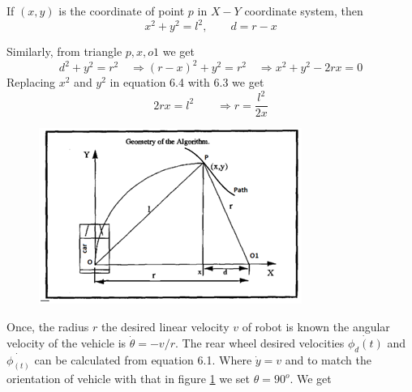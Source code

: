 If $(x,y)$ is the coordinate of point $p$ in $X-Y$ coordinate system, then 
\begin{equation}
x^2+y^2=l^2, \quad \quad d=r-x
\end{equation}

Similarly, from triangle $p, x, o1$ we get
\begin{equation}
d^2+y^2=r^2\quad \Rightarrow (r-x)^2+y^2=r^2 \quad \Rightarrow x^2+y^2-2rx=0
\end{equation}
Replacing $x^2$ and $y^2$ in equation 6.4 with 6.3 we get
\begin{equation}
2rx=l^2\quad \quad \Rightarrow r=\frac{l^2}{2x}
\end{equation}
\begin{figure}
	\includegraphics[width=\linewidth,keepaspectratio]{Chapter6/fig/purepesuitgeometry}
	\label{fig:purePGeo} 
\end{figure}

Once, the radius $r$ the desired  linear velocity $v$ of robot is known the angular velocity of the vehicle is $\dot{\theta}=-v/r$. The rear wheel desired velocities $\dot{\phi_d(t)}$ and $\dot{\phi_(t)}$ can be calculated from equation 6.1. Where $\dot{y}=v$ and to match the orientation of vehicle with that in  figure \ref{fig:purePGeo} we set $\theta=90^o$. We get

